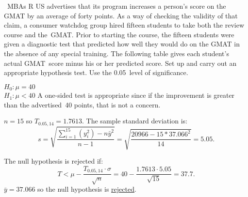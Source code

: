 \begin{problem}
  ~MBAs R US advertises that its program increases a person's score on the GMAT by an average of forty points.  As a way of checking the validity of that claim, a consumer watchdog group hired fifteen students to take both the review course and the~GMAT\@.  Prior to starting the course, the fifteen students were given a diagnostic test that predicted how well they would do on the GMAT in the absence of any special training.  The following table gives each student's actual GMAT~score minus his or her predicted score.  Set up and carry out an appropriate hypothesis test.  Use the 0.05~level of significance.
\end{problem}

$H_0: \mu = 40$\\
$H_1: \mu < 40$  A one-sided test is appropriate since if the improvement is greater than the advertised~40 points, that is not a concern.

${n = 15}$ so ${T_{0.05,14} = 1.7613}$.  The sample standard deviation is:
\begin{equation}
  s = \sqrt{\frac{\sum_{i=1}^{15} \left(y_{i}^2\right) - n \bar{y}^2}{n-1}} = \sqrt{\frac{20966 - 15 * 37.066^2}{14}} = 5.05\text{.}
\end{equation}

The null hypothesis is rejected if:
\begin{equation}
  T < \mu - \frac{T_{0.05,14} \cdot \sigma}{\sqrt{n}} = 40 - \frac{1.7613 \cdot 5.05}{\sqrt{15}} = 37.7\text{.}
\end{equation}
${\bar{y} = 37.066}$ so the null hypothesis is \underline{rejected}.
